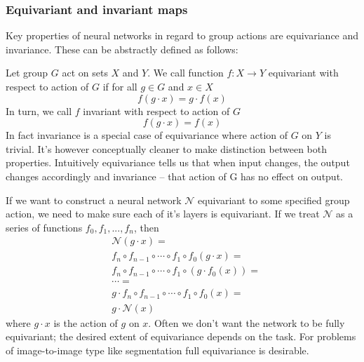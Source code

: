     \subsubsection{Equivariant and invariant maps}
    \hspace{0.5cm}
     Key properties of neural networks in regard to group actions are equivariance and invariance.
        These can be abstractly defined as follows: \par
        Let group $G$ act on sets $X$ and $Y$. We call function $f: X \rightarrow Y$ equivariant
        with respect to action of $G$ if for all $g \in G$ and $x \in X$
        \begin{equation}
            f(g \cdot x) = g \cdot f(x)
        \end{equation}
        In turn, we call $f$ invariant with respect to action of $G$
        \begin{equation}
            f(g \cdot x) = f(x)
        \end{equation}
        In fact invariance is a special case of equivariance where action of $G$ on $Y$ is trivial.
        It's however conceptually cleaner to make distinction between both properties.
        Intuitively equivariance tells us that when input changes, the output changes accordingly
        and invariance -- that action of G has no effect on output.\par
            If we want to construct a neural network $\mathcal{N}$ equivariant to some
        specified group action, we need to make sure each of it's layers is equivariant.
        If we treat $\mathcal{N}$ as a series of functions $f_0,f_1,...,f_n$, then
        \begin{align*}
            & \mathcal{N}(g \cdot x) = \\
            & f_n \circ f_{n-1} \circ \cdots \circ f_1 \circ f_0(g\cdot x) =  \\
            & f_n \circ f_{n-1} \circ \cdots \circ f_1 \circ \left( g \cdot f_0(x) \right) = \\
            & \cdots = \\
            & g \cdot f_n \circ f_{n-1} \circ \cdots \circ f_1 \circ f_0(x) = \\
            & g \cdot \mathcal{N}(x)
        \end{align*}
        where $g\cdot x$ is the action of $g$ on $x$. Often we don't want the network
        to be fully equivariant; the desired extent of equivariance depends on the task.
        For problems of image-to-image type like segmentation full equivariance is desirable.
